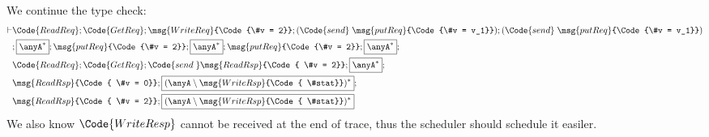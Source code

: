 We continue the type check:
{\footnotesize\begin{align*}
    \vdash &\Code{ReadReq};\Code{GetReq};\msg{WriteReq}{\Code{\#v = 2}};(\Code{send}\; \msg{putReq}{\Code{\#v = v_1}});(\Code{send}\; \msg{putReq}{\Code{\#v = v_1}})
    \\&;\boxed{\anyA^*};\msg{putReq}{\Code{\#v = 2}};\boxed{\anyA^*};\msg{putReq}{\Code{\#v = 2}};\boxed{\anyA^*};
    \\&\Code{ReadReq};\Code{GetReq};\Code{send\;}\msg{ReadRsp}{\Code{ \#v = 2}}; \boxed{\anyA^*} ;
    \\&\msg{ReadRsp}{\Code{ \#v = 0}};\boxed{(\anyA \setminus \msg{WriteRsp}{\Code{ \#stat}})^*}; 
    \\&\msg{ReadRsp}{\Code{ \#v = 2}};\boxed{(\anyA \setminus \msg{WriteRsp}{\Code{ \#stat}})^*}
\end{align*}}\noindent
We also know $\Code{WriteResp}$ cannot be received at the end of trace, thus the scheduler should schedule it easiler.